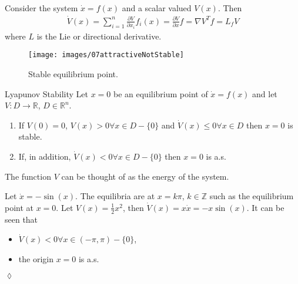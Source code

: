 \begin{definition}
Consider the system $\dot{x}=f(x)$ and a scalar valued $V(x)$.
Then
\begin{align*}
\dot{V}(x) = \sum_{i=1}^n \frac{\partial V}{\partial x_i} f_i(x) = \frac{\partial V}{\partial x}f = \nabla V^T f = L_f V
\end{align*}
where $L$ is the Lie or directional derivative.
\end{definition}

\begin{figure}[ht!]
\centering
\texttt{[image: images/07attractiveNotStable]}
\caption{Stable equilibrium point.}%
\label{fig:07attractiveNotStable}
\end{figure}

\begin{theorem}{Lyapunov Stability}
Let $x=0$ be an equilibrium point of $\dot{x}=f(x)$ and let $V:D\to\mathbb{R}$, $D\in\mathbb{R}^n$.
\begin{enumerate}
\item If $V(0)=0$, $V(x)>0 \forall x \in D - \{0\}$ and $\dot{V}(x)\leq0 \forall x\in D$ then $x=0$ is stable.
\item If, in addition, $\dot{V}(x)<0 \forall x\in D-\{0\}$ then $x=0$ is a.s.
\end{enumerate}
\end{theorem}

The function $V$ can be thought of as the energy of the system.

\begin{example}
Let $\dot{x}=-\sin(x)$.
The equilibria are at $x=k\pi$, $k\in\mathbb{Z}$ such as the equilibrium point at $x=0$.
Let $V(x)=\tfrac{1}{2}x^2$, then $\dot{V}(x)=x\dot{x}=-x\sin(x)$.
It can be seen that
\begin{itemize}
\item $\dot{V}(x) < 0 \forall x\in(-\pi,\pi)-\{0\}$,
\item the origin $x=0$ is a.s.
\end{itemize}
$\lozenge$
\end{example}
